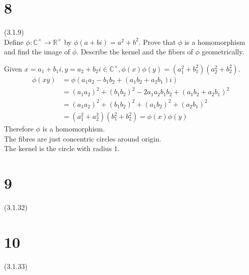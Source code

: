 \documentclass{article}
\begin{document}
\section*{8}
(3.1.9)\\
Define $\phi: \mathbb{C}^{\times} \rightarrow \mathbb{R}^{\times}$ by $\phi(a+bi) = a^2+b^2$. Prove that $\phi$ is a homomorphism and find the image of $\phi$. Describe the kernel and the fibers of $\phi$ geometrically.
\begin{addmargin}[1em]{0em}
    Given $x = a_1+b_1i, y = a_2+b_2i \in \mathbb{C}^\times, \phi(x)\phi(y) = (a_1^2+b_1^2)(a_2^2+b_2^2)$.
    \begin{equation*}
        \begin{split}
            \phi(xy) &= \phi(a_1a_2-b_1b_2 + (a_1b_2+a_2b_1)i)\\
            &= (a_1a_2)^2 + (b_1b_2)^2 - 2a_1a_2b_1b_2 + (a_1b_2 + a_2b_1)^2\\
            &= (a_1a_2)^2 + (b_1b_2)^2 + (a_1b_2)^2 + (a_2b_1)^2\\
            &= (a_1^2 + a_2^2)(b_1^2 + b_2^2) = \phi(x)\phi(y)
        \end{split}
    \end{equation*}
    Therefore $\phi$ is a homomorphism.\\
    The fibres are just concentric circles around origin.\\
    The kernel is the circle with radius 1.
\end{addmargin}
\section*{9}
(3.1.32)
\section*{10}
(3.1.33)
\end{document}
